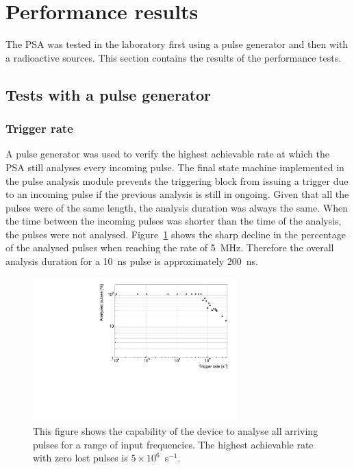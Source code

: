 \section{Performance results}
\label{sec:perres}
The PSA was tested in the laboratory first using a pulse generator and then with a radioactive sources. This section contains the results of the performance tests.

\subsection{Tests with a pulse generator}
\subsubsection{Trigger rate}
A pulse generator was used to verify the highest achievable rate at which the PSA still analyses every incoming pulse. The final state machine implemented in the pulse analysis module prevents the triggering block from issuing a trigger due to an incoming pulse if the previous analysis is still in ongoing. Given that all the pulses were of the same length, the analysis duration was always the same. When the time between the incoming pulses was shorter than the time of the analysis, the pulses were not analysed. Figure~\ref{fig:trigrate} shows the sharp decline in the percentage of the analysed pulses when reaching the rate of 5~MHz. Therefore the overall analysis duration for a 10~ns pulse is approximately 200~ns.

\begin{figure}[!t]
\centering
\includegraphics[width=0.7\textwidth]{../scripts/05_current_monitoring/PulseGenTests/plots/freq}
\caption{This figure shows the capability of the device to analyse all arriving pulses for a range of input frequencies. The highest achievable rate with zero lost pulses is $5\times10^6$~s$^{-1}$.}
\label{fig:trigrate}
\end{figure}


